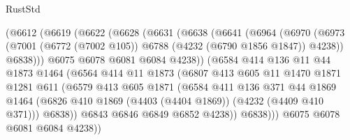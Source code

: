 \begin{lexlean}{RustStd}
\begin{coremodule}
                  (@6612
                    (@6619
                      (@6622
                        (@6628
                          (@6631
                            (@6638
                              (@6641
                                (@6964
                                  (@6970
                                    (@6973
                                      (@7001
                                        (@6772 (@7002 @105))
                                        @6788
                                        (@4232 (@6790 @1856 @1847))
                                        @4238))
                                    @6838)))
                              @6075
                              @6078
                              @6081
                              @6084
                              @4238))
                          (@6584
                            @414
                            @136
                            @11
                            @44
                            @1873
                            @1464
                            (@6564
                              @414
                              @11
                              @1873
                              (@6807
                                @413
                                @605
                                @11
                                @1470
                                @1871
                                @1281
                                @611
                                (@6579
                                  @413
                                  @605
                                  @1871
                                  (@6584
                                    @411
                                    @136
                                    @371
                                    @44
                                    @1869
                                    @1464
                                    (@6826
                                      @410
                                      @1869
                                      (@4403 (@4404 @1869))
                                      (@4232 (@4409 @410 @371)))
                                    @6838))
                                @6843
                                @6846
                                @6849
                                @6852
                                @4238))
                            @6838)))
                      @6075
                      @6078
                      @6081
                      @6084
                      @4238))

\end{coremodule}
\end{lexlean}
